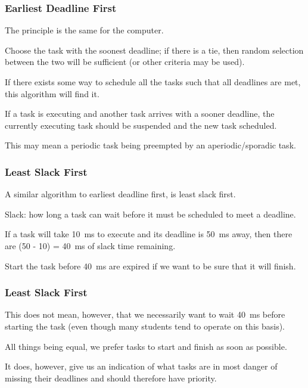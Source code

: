 \begin{frame}
\frametitle{Earliest Deadline First}

The principle is the same for the computer. 

Choose the task with the soonest deadline; if there is a tie, then random selection between the two will be sufficient (or other criteria may be used). 

If there exists some way to schedule all the tasks such that all deadlines are met, this algorithm will find it. 

If a task is executing and another task arrives with a sooner deadline, the currently executing task should be suspended and the new task scheduled. 

This may mean a periodic task being preempted by an aperiodic/sporadic task.


\end{frame}

\begin{frame}
\frametitle{Least Slack First}

A similar algorithm to earliest deadline first, is least slack first.

\alert{Slack}: how long a task can wait before it must be scheduled to meet a deadline.

If a task will take 10~ms to execute and its deadline is 50~ms away, then there are (50 - 10) = 40~ms of slack time remaining.

Start the task before 40~ms are expired if we want to be sure that it will finish. 

\end{frame}



\begin{frame}
\frametitle{Least Slack First}
This does not mean, however, that we necessarily want to wait 40~ms before starting the task (even though many students tend to operate on this basis). 

All things being equal, we prefer tasks to start and finish as soon as possible. 

It does, however, give us an indication of what tasks are in most danger of missing their deadlines and should therefore have priority.

\end{frame}




